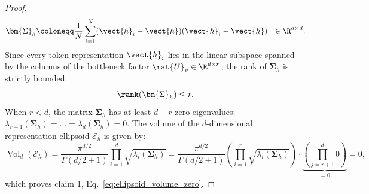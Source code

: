 \begin{proof}
\begin{equation}
\bm{\Sigma}_h \coloneqq \frac{1}{N} \sum_{i=1}^N (\vect{h}_i - \bar{\vect{h}})(\vect{h}_i - \bar{\vect{h}})^\top \in \R^{d \times d}.
\end{equation}
Since every token representation $\vect{h}_i$ lies in the linear subspace spanned by the columns of the bottleneck factor $\mat{U}_v \in \R^{d \times r}$, the rank of $\bm{\Sigma}_h$ is strictly bounded:
\begin{equation}
\rank(\bm{\Sigma}_h) \le r.
\end{equation}
When $r < d$, the matrix $\bm{\Sigma}_h$ has at least $d - r$ zero eigenvalues: $\lambda_{r+1}(\bm{\Sigma}_h) = \dots = \lambda_d(\bm{\Sigma}_h) = 0$.
The volume of the $d$-dimensional representation ellipsoid $\mathcal{E}_h$ is given by:
\begin{equation}
\operatorname{Vol}_d(\mathcal{E}_h) = \frac{\pi^{d/2}}{\Gamma(d/2 + 1)} \prod_{i=1}^d \sqrt{\lambda_i(\bm{\Sigma}_h)} = \frac{\pi^{d/2}}{\Gamma(d/2 + 1)} \left( \prod_{i=1}^r \sqrt{\lambda_i(\bm{\Sigma}_h)} \right) \cdot \underbrace{\left( \prod_{j=r+1}^d 0 \right)}_{= 0} = 0,
\end{equation}
which proves claim 1, Eq.~\eqref{eq:ellipsoid_volume_zero}.


\end{proof}
